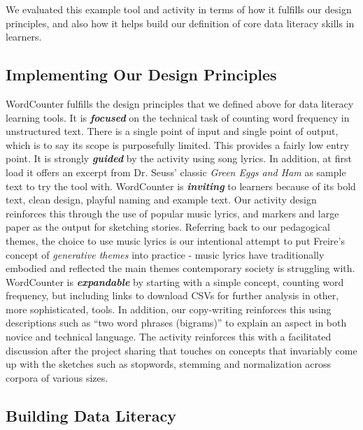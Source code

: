\documentclass{acm_proc_article-sp}
\begin{document}
We evaluated this example tool and activity in terms of how it fulfills our design principles, and also how it helps build our definition of core data literacy skills in learners.

\subsection{Implementing Our Design Principles}

WordCounter fulfills the design principles that we defined above for data literacy learning tools. It is \textbf{\textit{focused}} on the technical task of counting word frequency in unstructured text. There is a single point of input and single point of output, which is to say its scope is purposefully limited. This provides a fairly low entry point.  It is strongly \textbf{\textit{guided}} by the activity using song lyrics. In addition, at first load it offers an excerpt from Dr. Seuss' classic \emph{Green Eggs and Ham} as sample text to try the tool with.  WordCounter is \textbf{\textit{inviting}} to learners because of its bold text, clean design, playful naming and example text. Our activity design reinforces this through the use of popular music lyrics, and markers and large paper as the output for sketching stories.  Referring back to our pedagogical themes, the choice to use music lyrics is our intentional attempt to put Freire's concept of \emph{generative themes} into practice - music lyrics have traditionally embodied and reflected the main themes contemporary society is struggling with. WordCounter is \textbf{\textit{expandable}} by starting with a simple concept, counting word frequency, but including links to download CSVs for further analysis in other, more sophisticated, tools. In addition, our copy-writing reinforces this using descriptions such as \enquote{two word phrases (bigrams)} to explain an aspect in both novice and technical language.  The activity reinforces this with a facilitated discussion after the project sharing that touches on concepts that invariably come up with the sketches such as stopwords, stemming and normalization across corpora of various sizes.

\subsection{Building Data Literacy}
\end{document}
